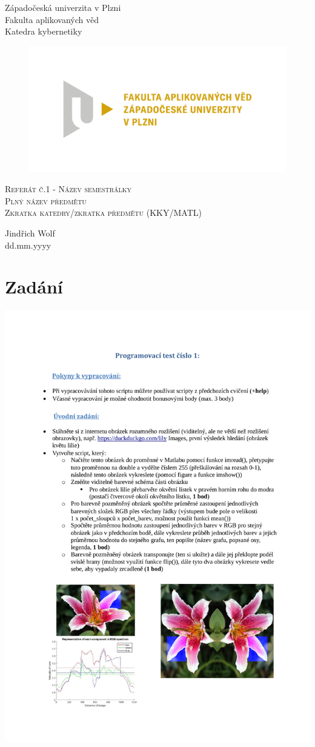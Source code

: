 \documentclass{article}
\author{Jindřich \textsc{Wolf}} %
\date{\today} %
\newcommand{\maketitlepage}{
	\begin{center}
	\thispagestyle{empty}
	
	{\LARGE{Západočeská univerzita v Plzni}}\\[.7em]
	{\LARGE{Fakulta aplikovaných věd}}\\[.7em]
	{\LARGE{Katedra kybernetiky}} \\[8cm]

	\begin{figure}[H]
		\centerline{\includegraphics[scale=0.7,trim = 0cm 0cm 0cm 10cm]{./pdfs/FAV_logo.pdf}}
	\end{figure}
	{\Huge\textsc{Referát č.1 - Název semestrálky}}\\[.5em]
	{\Large\textsc{Plný název předmětu}}\\
	{\textsc{Zkratka katedry/zkratka předmětu (KKY/MATL)}}
	\end{center}	
	\vfill
	

	\begin{flushright}
		\Large{Jindřich Wolf}\\
		\Large{dd.mm.yyyy}
	\end{flushright}
}
\begin{document}
 
\maketitlepage

\section{Zadání}
\includegraphics[scale=0.73]{./pdfs/Programovaci_test_1_pripravny.pdf} %
\newpage
\end{document}
